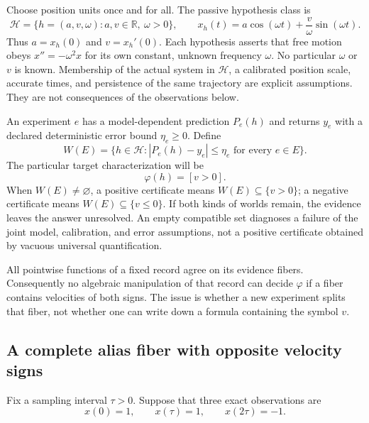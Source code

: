 \documentclass[11pt]{article}
\theoremstyle{definition}
\begin{document}
Choose position units once and for all. The passive hypothesis class is
\[
 \mathcal H=\{h=(a,v,\omega):a,v\in\mathbb R,\ \omega>0\},
 \qquad
 x_h(t)=a\cos(\omega t)+\frac{v}{\omega}\sin(\omega t).
\]
Thus $a=x_h(0)$ and $v=x_h'(0)$. Each hypothesis asserts that free motion
obeys $x''=-\omega^2x$ for its own constant, unknown frequency $\omega$.
No particular $\omega$ or $v$ is known. Membership of the actual system in
$\mathcal H$, a calibrated position scale, accurate times, and persistence
of the same trajectory are explicit assumptions. They are not consequences
of the observations below.

An experiment $e$ has a model-dependent prediction $P_e(h)$ and returns
$y_e$ with a declared deterministic error bound $\eta_e\geq0$. Define
\[
 W(E)=\{h\in\mathcal H:|P_e(h)-y_e|\leq\eta_e
                         \text{ for every }e\in E\}.
\]
The particular target characterization will be
\[
 \varphi(h)=[v>0].
\]
When $W(E)\ne\varnothing$, a positive certificate means
$W(E)\subseteq\{v>0\}$; a negative certificate means
$W(E)\subseteq\{v\leq0\}$. If both kinds of worlds remain, the evidence
leaves the answer unresolved. An empty compatible set diagnoses a failure
of the joint model, calibration, and error assumptions, not a positive
certificate obtained by vacuous universal quantification.

All pointwise functions of a fixed record agree on its evidence fibers.
Consequently no algebraic manipulation of that record can decide
$\varphi$ if a fiber contains velocities of both signs. The issue is
whether a new experiment splits that fiber, not whether one can write
down a formula containing the symbol $v$.

\subsection{A complete alias fiber with opposite velocity signs}

Fix a sampling interval $\tau>0$. Suppose that three exact observations are
\begin{equation}\label{eq:sci-three-samples}
 x(0)=1,\qquad x(\tau)=1,\qquad x(2\tau)=-1.
\end{equation}
\end{document}
